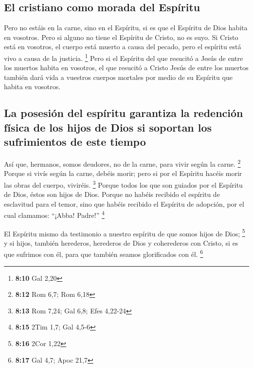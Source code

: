 \begin{paracol}{2}
\hypertarget{el-cristiano-como-morada-del-espuxedritu}{%
\subsection{El cristiano como morada del
Espíritu}\label{el-cristiano-como-morada-del-espuxedritu}}

 Pero no estáis en la carne, sino en el Espíritu, si es
que el Espíritu de Dios habita en vosotros. Pero si alguno no tiene el
Espíritu de Cristo, no es suyo.  Si Cristo está en
vosotros, el cuerpo está muerto a causa del pecado, pero el espíritu
está vivo a causa de la justicia. \footnote{\textbf{8:10} Gal 2,20}
 Pero si el Espíritu del que resucitó a Jesús de entre
los muertos habita en vosotros, el que resucitó a Cristo Jesús de entre
los muertos también dará vida a vuestros cuerpos mortales por medio de
su Espíritu que habita en vosotros.

\hypertarget{la-posesiuxf3n-del-espuxedritu-garantiza-la-redenciuxf3n-fuxedsica-de-los-hijos-de-dios-si-soportan-los-sufrimientos-de-este-tiempo}{%
\subsection{La posesión del espíritu garantiza la redención física de
los hijos de Dios si soportan los sufrimientos de este
tiempo}\label{la-posesiuxf3n-del-espuxedritu-garantiza-la-redenciuxf3n-fuxedsica-de-los-hijos-de-dios-si-soportan-los-sufrimientos-de-este-tiempo}}

 Así que, hermanos, somos deudores, no de la carne, para
vivir según la carne. \footnote{\textbf{8:12} Rom 6,7; Rom 6,18}
 Porque si vivís según la carne, debéis morir; pero si
por el Espíritu hacéis morir las obras del cuerpo, viviréis. \footnote{\textbf{8:13}
  Rom 7,24; Gal 6,8; Efes 4,22-24}  Porque todos los que
son guiados por el Espíritu de Dios, éstos son hijos de Dios.
 Porque no habéis recibido el espíritu de esclavitud para
el temor, sino que habéis recibido el Espíritu de adopción, por el cual
clamamos: ``¡Abba! Padre!'' \footnote{\textbf{8:15} 2Tim 1,7; Gal 4,5-6}

 El Espíritu mismo da testimonio a nuestro espíritu de
que somos hijos de Dios; \footnote{\textbf{8:16} 2Cor 1,22}
 y si hijos, también herederos, herederos de Dios y
coherederos con Cristo, si es que sufrimos con él, para que también
seamos glorificados con él. \footnote{\textbf{8:17} Gal 4,7; Apoc 21,7}


\end{paracol}
